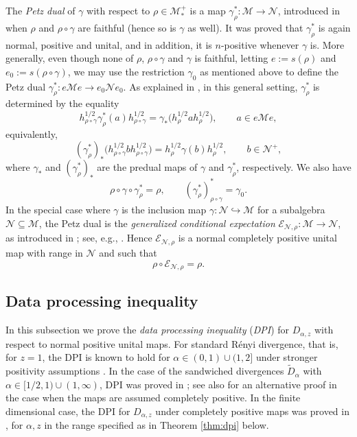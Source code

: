 \documentclass[12pt]{article}
\theoremstyle{definition}
\theoremstyle{remark}
\numberwithin{equation}{section}
\def\cE{\mathcal E}
\def\Me{\mathcal M}
\def\Ne{\mathcal N}
\begin{document}
The \emph{Petz dual} of $\gamma$ with respect to $\rho\in \Me_*^+$ is a map
$\gamma_\rho^*:\Me\to \Ne$, introduced in \cite{petz1988sufficiency} when $\rho$ and
$\rho\circ\gamma$ are faithful (hence so is $\gamma$ as well). It was proved that
$\gamma_\rho^*$ is again normal, positive and unital, and in addition, it is $n$-positive whenever
$\gamma$ is. More generally, even though none of $\rho$, $\rho\circ\gamma$ and
$\gamma$ is faithful, letting $e:=s(\rho)$ and $e_0:=s(\rho\circ\gamma)$, we may use the restriction
$\gamma_0$ as mentioned above to define the Petz dual $\gamma^*_\rho: e\Me e\to e_0\Ne e_0$. 
As explained in \cite{jencova2018renyi}, in this general setting, $\gamma^*_\rho$ is determined by
the equality
\[
h_{\rho\circ\gamma}^{1/2}\gamma_\rho^*(a)h_{\rho\circ\gamma}^{1/2}
=\gamma_*\bigl(h_\rho^{1/2}ah_\rho^{1/2}\bigr),
\qquad a\in e\Me e,
\]
equivalently,
\begin{equation}\label{eq:petzdual}
(\gamma^*_\rho)_*\bigl(h_{\rho\circ\gamma}^{1/2}bh_{\rho\circ\gamma}^{1/2}\bigr)
=h_\rho^{1/2}\gamma(b)h_\rho^{1/2},\qquad b\in\Ne^+,
\end{equation}
where $\gamma_*$ and $(\gamma^*_\rho)_*$ are the predual maps of $\gamma$ and $\gamma^*_\rho$,
respectively.
We also have
\begin{equation}\label{eq:petzdual2}
\rho\circ\gamma\circ\gamma^*_\rho=\rho,\qquad (\gamma_\rho^*)_{\rho\circ\gamma}^*=\gamma_0.
\end{equation}
In the special case where $\gamma$ is the
inclusion map $\gamma: \Ne\hookrightarrow \Me$ for a subalgebra $\Ne\subseteq \Me$, the Petz dual
is the \emph{generalized conditional expectation} $\cE_{\Ne,\rho}:\Me\to \Ne$, as introduced in
\cite{accardi1982conditional}; see, e.g., \cite[Proposition 6.5]{hiai2021quantum}. Hence 
$\cE_{\Ne,\rho}$ is a normal completely positive unital map with range in $\Ne$ and such that 
\[
\rho\circ \cE_{\Ne,\rho}=\rho.
\]


\subsection{Data processing inequality}

In this subsection we prove the \emph{data processing inequality} (\emph{DPI}) for
$D_{\alpha,z}$ with respect to normal positive unital maps. For standard R\'enyi divergence, that is,
for $z=1$, {the} DPI is known to hold for $\alpha\in (0,1)\cup (1,2]$ under stronger positivity
assumptions \cite{hiai2018quantum}. In the case of the sandwiched divergences $\tilde D_\alpha$ with
{$\alpha\in[1/2,1)\cup(1,\infty)$,} DPI was proved in \cite{jencova2018renyi,jencova2021renyi};
see also \cite{berta2018renyi} for an alternative proof in the case when the maps are assumed
completely positive. In the finite dimensional case, the DPI for $D_{\alpha,z}$ under completely
positive maps was proved in \cite{zhang2020fromwyd}, for $\alpha,z$ in the range specified as
in Theorem \ref{thm:dpi} below.
\end{document}
